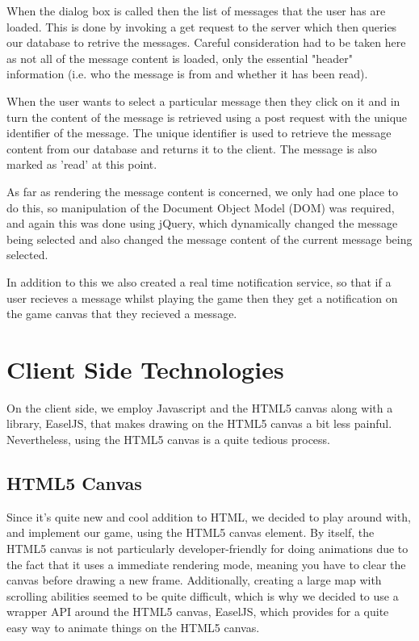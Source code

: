 \documentclass[a4paper,11pt]{article}
\begin{document}
		When the dialog box is called then the list of messages that the user has are loaded. This is done by invoking a get request to the server which then queries our database to retrive the messages. Careful consideration had to be taken here as not all of the message content is loaded, only the essential "header" information (i.e. who the message is from and whether it has been read).

		When the user wants to select a particular message then they click on it and in turn the content of the message is retrieved using a post request with the unique identifier of the message. The unique identifier is used to retrieve the message content from our database and returns it to the client. The message is also marked as 'read' at this point.

		As far as rendering the message content is concerned, we only had one place to do this, so manipulation of the Document Object Model (DOM) was required, and again this was done using jQuery, which dynamically changed the message being selected and also changed the message content of the current message being selected.

		In addition to this we also created a real time notification service, so that if a user recieves a message whilst playing the game then they get a notification on the game canvas that they recieved a message.
		
		
	
	\section{Client Side Technologies}
		On the client side, we employ Javascript and the HTML5 canvas along with a library, EaselJS, that makes drawing on the HTML5 canvas a bit less painful. Nevertheless, using the HTML5 canvas is a quite tedious process.
	
		\subsection{HTML5 Canvas}
			Since it's quite new and cool addition to HTML, we decided to play around with, and implement our game, using the HTML5 canvas element. By itself, the HTML5 canvas is not particularly developer-friendly for doing animations due to the fact that it uses a immediate rendering mode, meaning you have to clear the canvas before drawing a new frame. Additionally, creating a large map with scrolling abilities seemed to be quite difficult, which is why we decided to use a wrapper API around the HTML5 canvas, EaselJS, which provides for a quite easy way to animate things on the HTML5 canvas.
			
\end{document}
